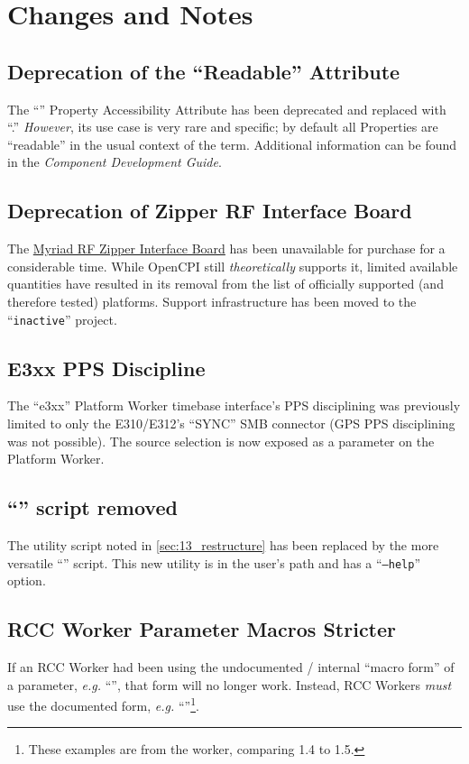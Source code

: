 \section{Changes and Notes}
\subsection{Deprecation of the ``Readable'' Attribute}
\label{sec:15_readable}
The ``'' Property Accessibility Attribute has been deprecated and replaced with ``.'' \textit{However}, its use case is very rare and specific; by default all Properties are ``readable'' in the usual context of the term.
Additional information can be found in the \textit{Component Development Guide}.

\subsection{Deprecation of Zipper RF Interface Board}
\label{sec:15_zipper} %
The \href{https://wiki.myriadrf.org/Zipper_Interface_Board}{Myriad RF Zipper Interface Board} has been unavailable for purchase for a considerable time. While OpenCPI still \textit{theoretically} supports it, limited available quantities have resulted in its removal from the list of officially supported (and therefore tested) platforms. Support infrastructure has been moved to the ``\texttt{inactive}'' project.
\subsection{E3xx PPS Discipline}
\label{sec:15_e3xx_gps} %
The ``e3xx'' Platform Worker timebase interface's PPS disciplining was previously limited to only the E310/E312's ``SYNC'' SMB connector (GPS PPS disciplining was not possible). The source selection is now exposed as a parameter on the Platform Worker.
\subsection{``'' script removed} %
\label{sec:15_new_project_source}
The utility script noted in \ref{sec:13_restructure} has been replaced by the more versatile ``'' script. This new utility is in the user's path and has a ``\texttt{--help}'' option.
\subsection{RCC Worker Parameter Macros Stricter} %
If an RCC Worker had been using the undocumented / internal ``macro form'' of a parameter, \textit{e.g.} ``'', that form will no longer work. Instead, RCC Workers \textit{must} use the documented form, \textit{e.g.} ``''\footnote{These examples are from the  worker, comparing 1.4 to 1.5.}.
